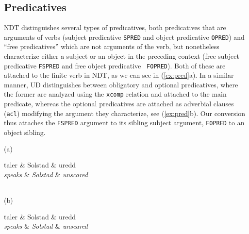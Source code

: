\documentclass[10pt, a4paper]{article}
\let\w=\emph
\begin{document}
\subsection{Predicatives}
NDT distinguishes several types of predicatives, both predicatives
that are arguments of verbs (subject predicative {\tt SPRED} and
object predicative {\tt OPRED}) and ``free predicatives'' which are
not arguments of the verb, but nonetheless characterize either a
subject or an object in the preceding context (free subject
predicative {\tt FSPRED} and free object predicative {\tt
  FOPRED}). Both of these are attached to the finite verb in NDT, as we can see in (\ref{ex:pred}a). In a
similar manner, UD distinguishes between obligatory and optional
predicatives, where the former are analyzed using the {\tt xcomp}
relation and attached to the main predicate, whereas the optional
predicatives are attached as adverbial clauses ({\tt acl}) modifying the argument
they characterize, see (\ref{ex:pred}b). Our conversion thus attaches the {\tt FSPRED} argument to its sibling subject argument, {\tt FOPRED} to an object sibling.
\begin{examples}
\item\label{ex:pred} 
(a)\\
    \begin{dependency}
        \begin{deptext}[column sep=.2cm]
          taler \& Solstad \& uredd \\
          \w{speaks} \& \w{Solstad} \& \w{unscared} \\
        \end{deptext}
    \end{dependency}
\\(b)\\
    \begin{dependency}
        \begin{deptext}[column sep=.2cm]
          taler \& Solstad \& uredd \\
          \w{speaks} \& \w{Solstad} \& \w{unscared} \\
        \end{deptext}
    \end{dependency}
\end{examples}
\end{document}

